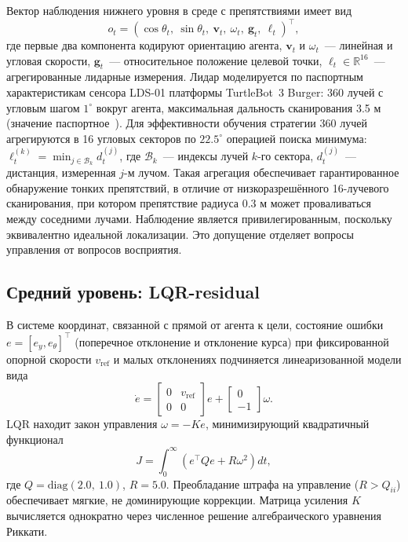 \documentclass[11pt]{article}
\begin{document}
Вектор наблюдения нижнего уровня в среде с препятствиями имеет вид
\begin{equation}
o_t = (\cos\theta_t,\ \sin\theta_t,\ \mathbf{v}_t,\ \omega_t,\ \mathbf{g}_t,\ \ell_t)^\top,
\end{equation}
где первые два компонента кодируют ориентацию агента, $\mathbf{v}_t$ и $\omega_t$~--- линейная и угловая скорости, $\mathbf{g}_t$~--- относительное положение целевой точки, $\ell_t \in \mathbb{R}^{16}$~--- агрегированные лидарные измерения. Лидар моделируется по паспортным характеристикам сенсора LDS-01 платформы TurtleBot~3 Burger: 360 лучей с угловым шагом $1^\circ$ вокруг агента, максимальная дальность сканирования 3.5 м (значение паспортное~\cite{lds01_datasheet}). Для эффективности обучения стратегии 360 лучей агрегируются в 16 угловых секторов по $22.5^\circ$ операцией поиска минимума: $\ell_t^{(k)} = \min_{j \in \mathcal{B}_k} d_t^{(j)}$, где $\mathcal{B}_k$~--- индексы лучей $k$-го сектора, $d_t^{(j)}$~--- дистанция, измеренная $j$-м лучом. Такая агрегация обеспечивает гарантированное обнаружение тонких препятствий, в отличие от низкоразрешённого 16-лучевого сканирования, при котором препятствие радиуса 0.3 м может проваливаться между соседними лучами. Наблюдение является привилегированным, поскольку эквивалентно идеальной локализации. Это допущение отделяет вопросы управления от вопросов восприятия.


\subsection{Средний уровень: LQR-residual}
\label{sec:tactical}

В системе координат, связанной с прямой от агента к цели, состояние
ошибки $e = [e_y, e_\theta]^\top$ (поперечное отклонение и отклонение
курса) при фиксированной опорной скорости $v_{\mathrm{ref}}$ и малых
отклонениях подчиняется линеаризованной модели вида
\begin{equation}
\label{eq:lqr_model}
\dot{e} = \begin{bmatrix} 0 & v_{\mathrm{ref}} \\ 0 & 0 \end{bmatrix} e
         + \begin{bmatrix} 0 \\ -1 \end{bmatrix} \omega.
\end{equation}
LQR находит закон управления $\omega = -K e$, минимизирующий
квадратичный функционал
\begin{equation}
J = \int_0^\infty \left( e^\top Q e + R \omega^2 \right) dt,
\end{equation}
где $Q = \mathrm{diag}(2.0,\ 1.0)$, $R = 5.0$. Преобладание штрафа
на управление ($R > Q_{ii}$) обеспечивает мягкие, не доминирующие
коррекции. Матрица усиления $K$ вычисляется однократно через численное
решение алгебраического уравнения Риккати.
\end{document}
